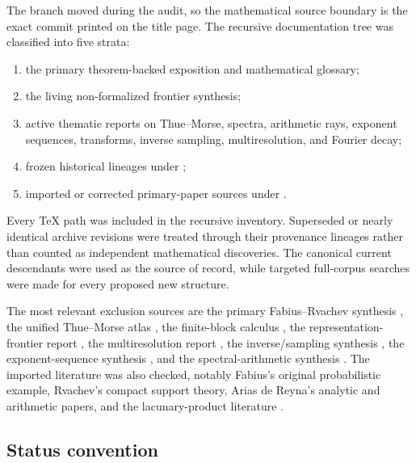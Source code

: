 \documentclass[11pt]{article}
\theoremstyle{definition}
\theoremstyle{remark}
\begin{document}
The branch moved during the audit, so the mathematical source boundary is the
exact commit printed on the title page.  The recursive documentation tree was
classified into five strata:
\begin{enumerate}
\item the primary theorem-backed exposition and mathematical glossary;
\item the living non-formalized frontier synthesis;
\item active thematic reports on Thue--Morse, spectra, arithmetic rays,
      exponent sequences, transforms, inverse sampling, multiresolution, and
      Fourier decay;
\item frozen historical lineages under ;
\item imported or corrected primary-paper sources under .
\end{enumerate}
Every TeX path was included in the recursive inventory.  Superseded or nearly
identical archive revisions were treated through their provenance lineages
rather than counted as independent mathematical discoveries.  The canonical
current descendants were used as the source of record, while targeted
full-corpus searches were made for every proposed new structure.

The most relevant exclusion sources are the primary Fabius--Rvachev synthesis
\cite{p5:repoPrimary}, the unified Thue--Morse atlas \cite{p5:repoAtlas}, the
finite-block calculus \cite{p5:repoFiniteBlock}, the representation-frontier
report \cite{p5:repoRepresentations}, the multiresolution report
\cite{p5:repoMultiresolution}, the inverse/sampling synthesis \cite{p5:repoInverse},
the exponent-sequence synthesis \cite{p5:repoExponents}, and the
spectral-arithmetic synthesis \cite{p5:repoSpectra}.  The imported literature was
also checked, notably Fabius's original probabilistic example, Rvachev's compact
support theory, Arias de Reyna's analytic and arithmetic papers, and the
lacunary-product literature \cite{p5:fabius1966,p5:rvachev1990,p5:arias1982,p5:arias2018,p5:aistleitner2017}.

\subsection{Status convention}
\end{document}
